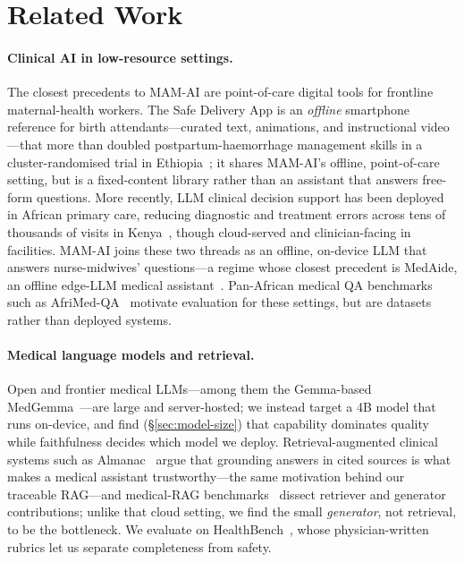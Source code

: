 \section{Related Work}
\label{sec:related}

\paragraph{Clinical AI in low-resource settings.} The closest precedents to
MAM-AI are point-of-care digital tools for frontline maternal-health workers.
The Safe Delivery App is an \emph{offline} smartphone reference for birth
attendants---curated text, animations, and instructional video---that more than
doubled postpartum-haemorrhage management skills in a cluster-randomised trial in
Ethiopia~\cite{christiansen2023safedelivery}; it shares MAM-AI's offline,
point-of-care setting, but is a fixed-content library rather than an assistant
that answers free-form questions. More recently, LLM clinical decision support
has been deployed in African primary care, reducing diagnostic and treatment
errors across tens of thousands of visits in Kenya~\cite{korom2025clinical},
though cloud-served and clinician-facing in facilities. MAM-AI joins these two
threads as an offline, on-device LLM that answers nurse-midwives'
questions---a regime whose closest precedent is MedAide, an offline edge-LLM
medical assistant~\cite{basit2024medaide}. Pan-African medical QA benchmarks such as
AfriMed-QA~\cite{olatunji2025afrimedqa} motivate evaluation for these settings,
but are datasets rather than deployed systems.

\paragraph{Medical language models and retrieval.} Open and frontier medical
LLMs---among them the Gemma-based MedGemma~\cite{sellergren2025medgemma}---are
large and server-hosted; we instead target a 4B model that runs on-device, and
find (\S\ref{sec:model-size}) that capability dominates quality while
faithfulness decides which model we deploy. Retrieval-augmented clinical systems
such as Almanac~\cite{zakka2024almanac} argue that grounding answers in cited
sources is what makes a medical assistant trustworthy---the same motivation
behind our traceable RAG---and medical-RAG benchmarks~\cite{xiong2024benchmarking}
dissect retriever and generator contributions; unlike that cloud setting, we
find the small \emph{generator}, not retrieval, to be the bottleneck. We
evaluate on HealthBench~\cite{arora2025healthbench}, whose physician-written
rubrics let us separate completeness from safety.

